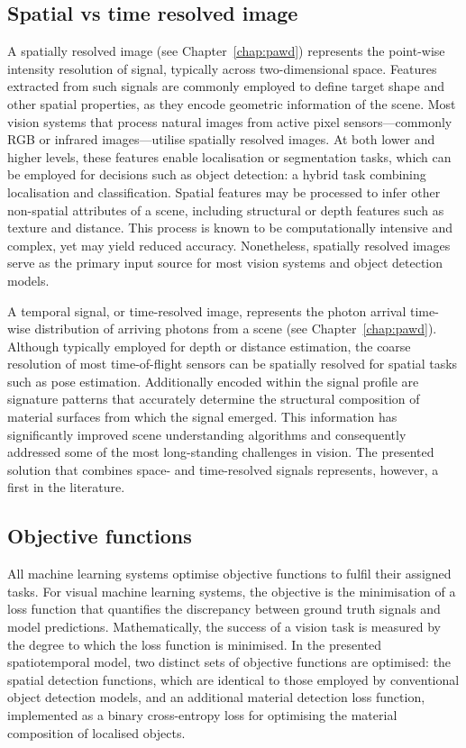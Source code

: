 \documentclass[12pt,a4paper,oneside]{report}
\begin{document}
\subsection{Spatial vs time resolved image}
\label{subsec:spatially_resolved_image}

A spatially resolved image (see Chapter~\ref{chap:pawd}) represents the point-wise intensity resolution of signal, typically across two-dimensional space. Features extracted from such signals are commonly employed to define target shape and other spatial properties, as they encode geometric information of the scene. Most vision systems that process natural images from active pixel sensors—commonly RGB or infrared images—utilise spatially resolved images. At both lower and higher levels, these features enable localisation or segmentation tasks, which can be employed for decisions such as object detection: a hybrid task combining localisation and classification. Spatial features may be processed to infer other non-spatial attributes of a scene, including structural or depth features such as texture and distance. This process is known to be computationally intensive and complex, yet may yield reduced accuracy. Nonetheless, spatially resolved images serve as the primary input source for most vision systems and object detection models.

A temporal signal, or time-resolved image, represents the photon arrival time-wise distribution of arriving photons from a scene (see Chapter~\ref{chap:pawd}). Although typically employed for depth or distance estimation, the coarse resolution of most time-of-flight sensors can be spatially resolved for spatial tasks such as pose estimation. Additionally encoded within the signal profile are signature patterns that accurately determine the structural composition of material surfaces from which the signal emerged. This information has significantly improved scene understanding algorithms and consequently addressed some of the most long-standing challenges in vision. The presented solution that combines space- and time-resolved signals represents, however, a first in the literature.

\subsection{Objective functions}
\label{sec:objective_functions}

All machine learning systems optimise objective functions to fulfil their assigned tasks. For visual machine learning systems, the objective is the minimisation of a loss function that quantifies the discrepancy between ground truth signals and model predictions. Mathematically, the success of a vision task is measured by the degree to which the loss function is minimised. In the presented spatiotemporal model, two distinct sets of objective functions are optimised: the spatial detection functions, which are identical to those employed by conventional object detection models, and an additional material detection loss function, implemented as a binary cross-entropy loss for optimising the material composition of localised objects.
\end{document}
